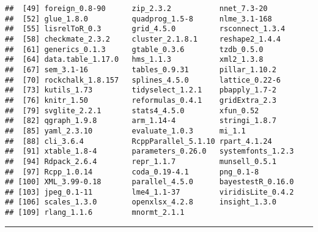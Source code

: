 \documentclass[
  11pt,
]{article}
\begin{document}
\begin{verbatim}
##  [49] foreign_0.8-90      zip_2.3.2           nnet_7.3-20        
##  [52] glue_1.8.0          quadprog_1.5-8      nlme_3.1-168       
##  [55] lisrelToR_0.3       grid_4.5.0          rsconnect_1.3.4    
##  [58] checkmate_2.3.2     cluster_2.1.8.1     reshape2_1.4.4     
##  [61] generics_0.1.3      gtable_0.3.6        tzdb_0.5.0         
##  [64] data.table_1.17.0   hms_1.1.3           xml2_1.3.8         
##  [67] sem_3.1-16          tables_0.9.31       pillar_1.10.2      
##  [70] rockchalk_1.8.157   splines_4.5.0       lattice_0.22-6     
##  [73] kutils_1.73         tidyselect_1.2.1    pbapply_1.7-2      
##  [76] knitr_1.50          reformulas_0.4.1    gridExtra_2.3      
##  [79] svglite_2.2.1       stats4_4.5.0        xfun_0.52          
##  [82] qgraph_1.9.8        arm_1.14-4          stringi_1.8.7      
##  [85] yaml_2.3.10         evaluate_1.0.3      mi_1.1             
##  [88] cli_3.6.4           RcppParallel_5.1.10 rpart_4.1.24       
##  [91] xtable_1.8-4        parameters_0.26.0   systemfonts_1.2.3  
##  [94] Rdpack_2.6.4        repr_1.1.7          munsell_0.5.1      
##  [97] Rcpp_1.0.14         coda_0.19-4.1       png_0.1-8          
## [100] XML_3.99-0.18       parallel_4.5.0      bayestestR_0.16.0  
## [103] jpeg_0.1-11         lme4_1.1-37         viridisLite_0.4.2  
## [106] scales_1.3.0        openxlsx_4.2.8      insight_1.3.0      
## [109] rlang_1.1.6         mnormt_2.1.1
\end{verbatim}

\begin{center}\rule{0.5\linewidth}{0.5pt}\end{center}
\end{document}
